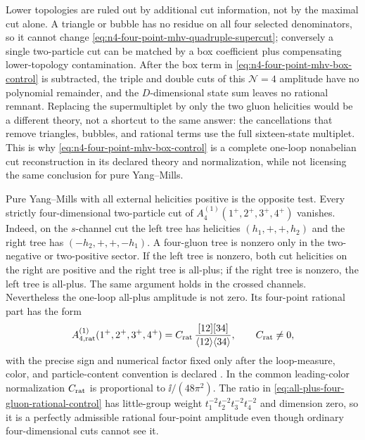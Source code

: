 Lower topologies are ruled out by additional cut information, not by the
maximal cut alone.  A triangle or bubble has no residue on all four selected
denominators, so it cannot change
\eqref{eq:n4-four-point-mhv-quadruple-supercut}; conversely a single
two-particle cut can be matched by a box coefficient plus compensating
lower-topology contamination.  After the box term in
\eqref{eq:n4-four-point-mhv-box-control} is subtracted, the triple and double
cuts of this \(\mathcal N=4\) amplitude have no polynomial remainder, and
the \(D\)-dimensional state sum leaves no rational remnant.  Replacing the
supermultiplet by only the two gluon helicities would be a different theory,
not a shortcut to the same answer: the cancellations that remove triangles,
bubbles, and rational terms use the full sixteen-state multiplet.  This is
why \eqref{eq:n4-four-point-mhv-box-control} is a complete one-loop
nonabelian cut reconstruction in its declared theory and normalization, while
not licensing the same conclusion for pure Yang--Mills.

Pure Yang--Mills with all external helicities positive is the opposite test.
Every strictly four-dimensional two-particle cut of
\(A_4^{(1)}(1^+,2^+,3^+,4^+)\) vanishes.  Indeed, on the \(s\)-channel cut the
left tree has helicities \((h_1,+,+,h_2)\) and the right tree has
\((-h_2,+,+,-h_1)\).  A four-gluon tree is nonzero only in the two-negative
or two-positive sector.  If the left tree is nonzero, both cut helicities on
the right are positive and the right tree is all-plus; if the right tree is
nonzero, the left tree is all-plus.  The same argument holds in the crossed
channels.  Nevertheless the one-loop all-plus amplitude is not zero.  Its
four-point rational part has the form
\begin{equation}
  A_{4,\mathrm{rat}}^{(1)}(1^+,2^+,3^+,4^+)
  =
  C_{\rm rat}\,
  \frac{[12][34]}{\langle12\rangle\langle34\rangle},
  \qquad C_{\rm rat}\ne0 ,
  \label{eq:all-plus-four-gluon-rational-control}
\end{equation}
with the precise sign and numerical factor fixed only after the loop-measure,
color, and particle-content convention is declared
\cite{BDDK1994Unitarity,BDK1996OneLoopQCD}.  In the common leading-color
normalization \(C_{\rm rat}\) is proportional to \(\ii/(48\pi^2)\).  The
ratio in \eqref{eq:all-plus-four-gluon-rational-control} has little-group
weight \(t_1^{-2}t_2^{-2}t_3^{-2}t_4^{-2}\) and dimension zero, so it is a
perfectly admissible rational four-point amplitude even though ordinary
four-dimensional cuts cannot see it.

